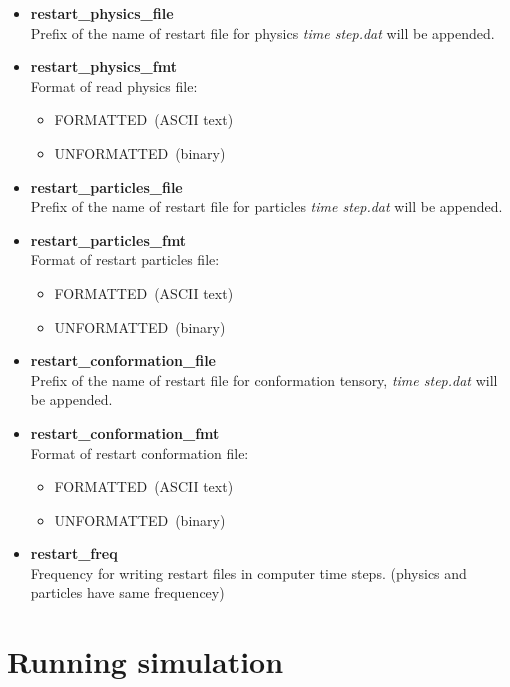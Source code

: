 \documentclass[a4paper,10pt]{article}
\begin{document}
\begin{itemize}
\item \textbf{restart\_physics\_file} \\
Prefix of the name of restart file for physics 
\textit{time step.dat} will be appended.

\item \textbf{restart\_physics\_fmt} \\
Format of read physics file:
\begin{itemize}
 \item 
FORMATTED~(ASCII text)
\item
UNFORMATTED~(binary)
\end{itemize}

\item \textbf{restart\_particles\_file} \\
Prefix of the name of restart file for particles 
\textit{time step.dat} will be appended.


\item \textbf{restart\_particles\_fmt } \\
Format of restart particles file:
\begin{itemize}
 \item 
FORMATTED~(ASCII text)
\item
UNFORMATTED~(binary)
\end{itemize}
\item \textbf{restart\_conformation\_file} \\
Prefix of the name of restart file for 
conformation tensory, 
\textit{time step.dat} will be appended.

\item \textbf{restart\_conformation\_fmt} \\
Format of restart conformation file:
\begin{itemize}
 \item 
FORMATTED~(ASCII text)
\item
UNFORMATTED~(binary)
\end{itemize}

\item \textbf{restart\_freq} \\
Frequency for writing restart files
in computer time steps.
(physics and particles have same frequencey)

\end{itemize}

\section{Running simulation}
\end{document}
